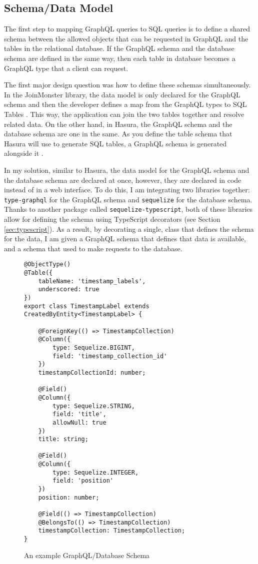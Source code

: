 \subsection{Schema/Data Model}\label{sec:schema}

The first step to mapping GraphQL queries to SQL queries is to define a shared schema between the allowed objects that can be requested in GraphQL and the tables in the relational database.  If the GraphQL schema and the database schema are defined in the same way, then each table in database becomes a GraphQL type that a client can request.

The first major design question was how to define these schemas simultaneously.  In the JoinMonster library, the data model is only declared for the GraphQL schema and then the developer defines a map from the GraphQL types to SQL Tables \cite{carlJoinMonster}.  This way, the application can join the two tables together and resolve related data.  On the other hand, in Hasura, the GraphQL schema and the database schema are one in the same.  As you define the table schema that Hasura will use to generate SQL tables, a GraphQL schema is generated alongside it \cite{hasurainc.HasuraGraphQLEngine}.

In my solution, similar to Hasura, the data model for the GraphQL schema and the database schema are declared at once, however, they are declared in code instead of in a web interface.  To do this, I am integrating two libraries together: \Verb!type-graphql! for the GraphQL schema and \Verb!sequelize! for the database schema.  Thanks to another package called \Verb!sequelize-typescript!, both of these libraries allow for defining the schema using TypeScript decorators (see Section \ref{sec:typescript}).  As a result, by decorating a single, class that defines the schema for the data, I am given a GraphQL schema that defines that data is available, and a schema that used to make requests to the database.

\begin{figure}
    \begin{verbatim}
@ObjectType()
@Table({
    tableName: 'timestamp_labels',
    underscored: true
})
export class TimestampLabel extends CreatedByEntity<TimestampLabel> {

    @ForeignKey(() => TimestampCollection)
    @Column({
        type: Sequelize.BIGINT,
        field: 'timestamp_collection_id'
    })
    timestampCollectionId: number;

    @Field()
    @Column({
        type: Sequelize.STRING,
        field: 'title',
        allowNull: true
    })
    title: string;

    @Field()
    @Column({
        type: Sequelize.INTEGER,
        field: 'position'
    })
    position: number;

    @Field(() => TimestampCollection)
    @BelongsTo(() => TimestampCollection)
    timestampCollection: TimestampCollection;
}
    \end{verbatim}
    \caption{An example GraphQL/Database Schema}
    \label{fig:example-entity}
\end{figure}

